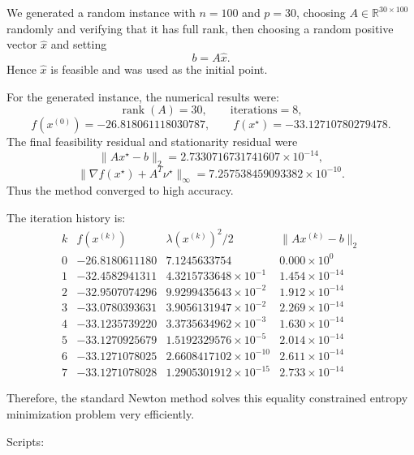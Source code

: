 \documentclass[11pt,letter,notitlepage]{article}
\theoremstyle{definition}
\begin{document}
\begin{solution}
We generated a random instance with \(n=100\) and \(p=30\), choosing \(A\in\mathbb R^{30\times 100}\) randomly and verifying that it has full rank, then choosing a random positive vector \(\hat x\) and setting
\[
b=A\hat x.
\]
Hence \(\hat x\) is feasible and was used as the initial point.

For the generated instance, the numerical results were:
\[
\operatorname{rank}(A)=30,
\qquad
\text{iterations}=8,
\]
\[
f(x^{(0)})=-26.818061118030787,
\qquad
f(x^\star)=-33.12710780279478.
\]
The final feasibility residual and stationarity residual were
\[
\|Ax^\star-b\|_2=2.7330716731741607\times 10^{-14},
\]
\[
\|\nabla f(x^\star)+A^T\nu^\star\|_\infty
=7.257538459093382\times 10^{-10}.
\]
Thus the method converged to high accuracy.

The iteration history is:
\[
\begin{array}{c|c|c|c}
k & f(x^{(k)}) & \lambda(x^{(k)})^2/2 & \|Ax^{(k)}-b\|_2\\
\hline
0 & -26.8180611180 & 7.1245633754 & 0.000\times 10^0\\
1 & -32.4582941311 & 4.3215733648\times 10^{-1} & 1.454\times 10^{-14}\\
2 & -32.9507074296 & 9.9299435643\times 10^{-2} & 1.912\times 10^{-14}\\
3 & -33.0780393631 & 3.9056131947\times 10^{-2} & 2.269\times 10^{-14}\\
4 & -33.1235739220 & 3.3735634962\times 10^{-3} & 1.630\times 10^{-14}\\
5 & -33.1270925679 & 1.5192329576\times 10^{-5} & 2.014\times 10^{-14}\\
6 & -33.1271078025 & 2.6608417102\times 10^{-10} & 2.611\times 10^{-14}\\
7 & -33.1271078028 & 1.2905301912\times 10^{-15} & 2.733\times 10^{-14}
\end{array}
\]

Therefore, the standard Newton method solves this equality constrained entropy minimization problem very efficiently.

Scripts:

\end{solution}

\newpage
\end{document}

